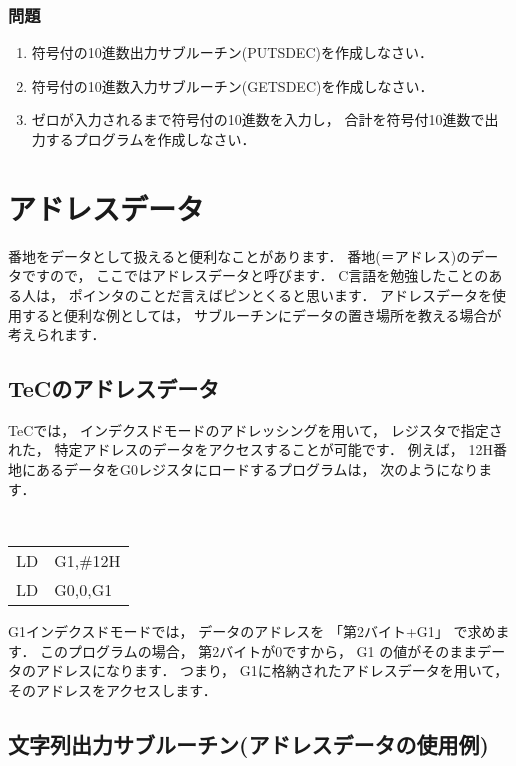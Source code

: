 \subsubsection{問題}
\begin{enumerate}
\item 符号付の10進数出力サブルーチン(PUTSDEC)を作成しなさい．
\item 符号付の10進数入力サブルーチン(GETSDEC)を作成しなさい．
\item ゼロが入力されるまで符号付の10進数を入力し，
合計を符号付10進数で出力するプログラムを作成しなさい．
\end{enumerate}

\newpage
\section{アドレスデータ}

番地をデータとして扱えると便利なことがあります．
番地(＝アドレス)のデータですので，
ここではアドレスデータと呼びます．
C言語を勉強したことのある人は，
ポインタのことだ言えばピンとくると思います．
アドレスデータを使用すると便利な例としては，
サブルーチンにデータの置き場所を教える場合が考えられます．

\subsection{TeCのアドレスデータ}

TeCでは，
インデクスドモードのアドレッシングを用いて，
レジスタで指定された，
特定アドレスのデータをアクセスすることが可能です．
例えば，
12H番地にあるデータをG0レジスタにロードするプログラムは，
次のようになります．

\begin{center}
{\tt
\begin{tabular}{l l}
LD & G1,\#12H       \\
LD & G0,0,G1 \\
\end{tabular}
}
\end{center}

G1インデクスドモードでは，
データのアドレスを 「第2バイト+G1」 で求めます．
このプログラムの場合，
第2バイトが0ですから，
G1 の値がそのままデータのアドレスになります．
つまり，
G1に格納されたアドレスデータを用いて，
そのアドレスをアクセスします．

\subsection{文字列出力サブルーチン(アドレスデータの使用例)}

